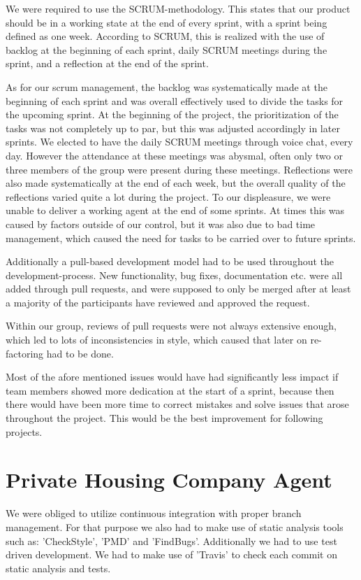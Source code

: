 We were required to use the SCRUM-methodology. This states that our product should be in a working state at the end of every sprint, with a sprint being defined as one week.
According to SCRUM, this is realized with the use of backlog at the beginning of each sprint, daily SCRUM meetings during the sprint, and a reflection at the end of the sprint.

As for our scrum management, the backlog was systematically made at the beginning of each sprint and was overall effectively used to divide the tasks for the upcoming sprint. At the beginning of the project, the prioritization of the tasks was not completely up to par, but this was adjusted accordingly in later sprints.
We elected to have the daily SCRUM meetings through voice chat, every day. However the attendance at these meetings was abysmal, often only two or three members of the group were present during these meetings.
Reflections were also made systematically at the end of each week, but the overall quality of the reflections varied quite a lot during the project.
To our displeasure, we were unable to deliver a working agent at the end of some sprints. At times this was caused by factors outside of our control, but it was also due to bad time management,
which caused the need for tasks to be carried over to future sprints.

Additionally a pull-based development model had to be used throughout the development-process. New functionality, bug fixes, documentation etc. were all added through pull requests, and were supposed to only be merged after at least a majority of the participants have reviewed and approved the request. 

Within our group, reviews of pull requests were not always extensive enough, which led to lots of inconsistencies in style, which caused that later on re-factoring had to be done.

Most of the afore mentioned issues would have had significantly less impact if team members showed more dedication at the start of a sprint, because then there would have been more time to correct mistakes and solve issues that arose throughout the project. This would be the best improvement for following projects. 

\section{Private Housing Company Agent}
\label{sec:Private Housing Company Agent}

We were obliged to utilize continuous integration with proper branch management. For that purpose we also had to make use of static analysis tools such as: 'CheckStyle', 'PMD' and 'FindBugs'. Additionally we had to use test driven development. We had to make use of 'Travis' to check each commit on static analysis and tests. 

